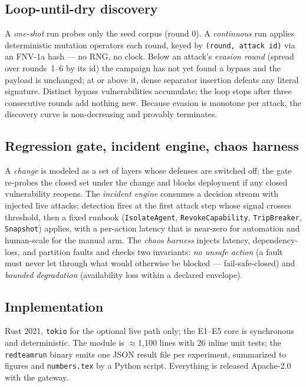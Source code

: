 \documentclass[11pt]{article}
\begin{document}
\subsection{Loop-until-dry discovery}
A \emph{one-shot} run probes only the seed corpus (round 0). A \emph{continuous} run
applies deterministic mutation operators each round, keyed by \texttt{(round, attack
id)} via an FNV-1a hash --- no RNG, no clock. Below an attack's
\emph{evasion round} (spread over rounds~1--6 by its id) the campaign has not yet
found a bypass and the payload is unchanged; at or above it, dense separator
insertion defeats any literal signature. Distinct bypass vulnerabilities accumulate;
the loop stops after three consecutive rounds add nothing new. Because evasion is
monotone per attack, the discovery curve is non-decreasing and provably terminates.

\subsection{Regression gate, incident engine, chaos harness}
A \emph{change} is modeled as a set of layers whose defenses are switched off; the
gate re-probes the closed set under the change and blocks deployment if any closed
vulnerability reopens. The \emph{incident engine} consumes a decision stream with
injected live attacks: detection fires at the first attack step whose signal crosses
threshold, then a fixed runbook (\texttt{IsolateAgent}, \texttt{RevokeCapability},
\texttt{TripBreaker}, \texttt{Snapshot}) applies, with a per-action latency that is
near-zero for automation and human-scale for the manual arm. The \emph{chaos
harness} injects latency, dependency-loss, and partition faults and checks two
invariants: \emph{no unsafe action} (a fault must never let through what would
otherwise be blocked --- fail-safe-closed) and \emph{bounded degradation}
(availability loss within a declared envelope).

\subsection{Implementation}
Rust 2021, \texttt{tokio} for the optional live path only; the E1--E5 core is
synchronous and deterministic. The module is $\approx$1{,}100 lines with 26 inline
unit tests; the \texttt{redteamrun} binary emits one JSON result file per experiment,
summarized to figures and \texttt{numbers.tex} by a Python script. Everything is
released Apache-2.0 with the gateway.

\end{document}
